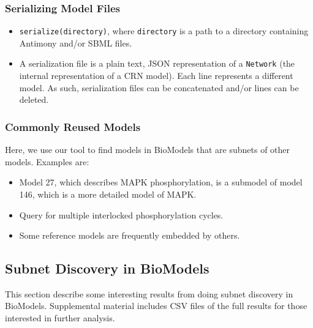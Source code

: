 \documentclass{article}
\begin{document}
\subsubsection{Serializing Model Files}
\begin{itemize}
    \item \texttt{serialize(directory)}, where \texttt{directory} is a path to a directory containing Antimony and/or SBML files.
    \item A serialization file is a plain text, JSON representation of a \texttt{Network} (the internal representation of a CRN model). Each line represents a different model. As such, serialization files can be concatenated and/or lines can be deleted.
\end{itemize}


\subsubsection{Commonly Reused Models}
Here, we use our tool to find models in BioModels that are subnets of other models. Examples are:
\begin{itemize}
    \item Model 27, which describes MAPK phosphorylation, is a submodel of model 146, which is a more detailed model of MAPK.
    \item Query for multiple interlocked phosphorylation cycles.
    \item Some reference models are frequently embedded by others.
    
\end{itemize}


\subsection{Subnet Discovery in BioModels}
This section describe some interesting results from doing subnet discovery in BioModels.
Supplemental material includes CSV files of the full results for those interested
in further analysis.
\end{document}

